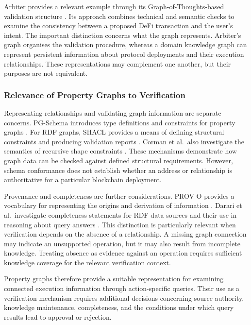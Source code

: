 Arbiter provides a relevant example through its
Graph-of-Thoughts-based validation structure
\cite{TODO_Arbiter2026}. Its approach combines
technical and semantic checks to examine the
consistency between a proposed DeFi transaction
and the user's intent. The important distinction concerns what the graph
represents. Arbiter's graph organises the validation
procedure, whereas a domain knowledge graph can
represent persistent information about protocol
deployments and their execution relationships.
These representations may complement one another,
but their purposes are not equivalent.


\subsubsection{Relevance of Property Graphs to Verification}

Representing relationships and validating graph
information are separate concerns. PG-Schema
introduces type definitions and constraints for
property graphs \cite{anglesPGSchema2023}.
For RDF graphs, SHACL provides a means of defining
structural constraints and producing validation
reports \cite{w3cSHACL2017}. Corman et al.\
also investigate the semantics of recursive shape
constraints \cite{cormanRecursiveSHACL2018}. These mechanisms demonstrate how graph data can
be checked against defined structural requirements.
However, schema conformance does not establish
whether an address or relationship is authoritative
for a particular blockchain deployment.

Provenance and completeness are further considerations.
PROV-O provides a vocabulary for representing the
origins and derivation of information
\cite{w3cPROVO2013}. Darari et al.\ investigate
completeness statements for RDF data sources and
their use in reasoning about query answers
\cite{darariCompletenessRDF2018}. This distinction is particularly relevant when
verification depends on the absence of a relationship.
A missing graph connection may indicate an unsupported
operation, but it may also result from incomplete
knowledge. Treating absence as evidence against an
operation requires sufficient knowledge coverage
for the relevant verification context.

Property graphs therefore provide a suitable
representation for examining connected execution
information through action-specific queries.
Their use as a verification mechanism requires
additional decisions concerning source authority,
knowledge maintenance, completeness, and the
conditions under which query results lead to
approval or rejection.


